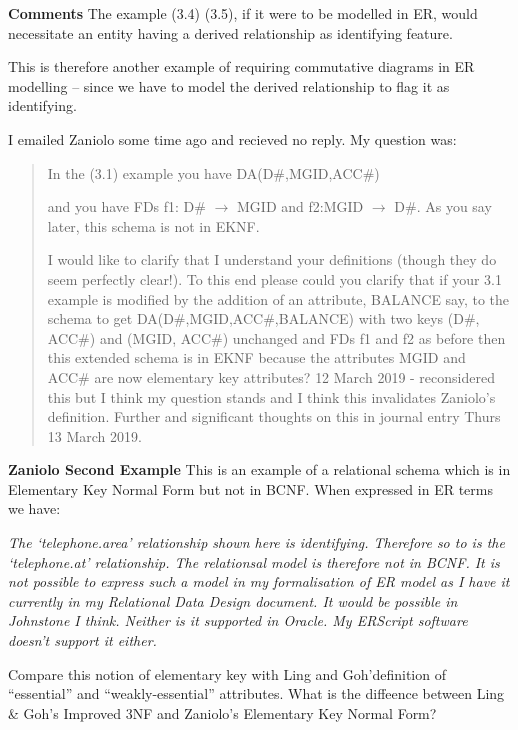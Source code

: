 \documentclass[10pt,a4paper]{scrartcl}
\renewcommand{\erpictureFolder}[0]{../SharedPictures}
\begin{document}
\textbf{Comments}
The example (3.4) (3.5), if it were to be modelled in ER, would necessitate an entity having a derived relationship as identifying feature.

This is therefore another example of requiring commutative diagrams in ER modelling -- since we have to model the derived relationship
to flag it as identifying.

I emailed Zaniolo some time ago and recieved no reply. My question was:
\begin{quote}
In the (3.1) example you have DA(D\#,MGID,ACC\#)  

and you have FDs f1: D\# $\rightarrow$ MGID and f2:MGID $\rightarrow$ D\#. As you say later, this schema is not in EKNF. 

I would like to clarify that I understand your definitions (though they do seem perfectly clear!). 
To this end please could you clarify that if your 3.1 example is modified by the addition of an attribute,
BALANCE say, to the schema to get DA(D\#,MGID,ACC\#,BALANCE) 
with two keys (D\#, ACC\#) and  (MGID, ACC\#) unchanged and FDs f1 and f2 
as before then this extended schema is in EKNF because 
the attributes MGID and ACC\# are now elementary key attributes? 
{\color{red} 12 March 2019 - reconsidered this but I think my question stands and I think this invalidates Zaniolo's definition. Further and significant thoughts on this in journal entry Thurs 13 March 2019. }
\end{quote}

\begin{center}

\end{center}


\textbf{Zaniolo Second Example}
This is an example of a relational schema which is in Elementary Key Normal Form but not in BCNF. When expressed in ER terms we have:
\begin{center}

\end{center}
\textit{The `telephone.area' relationship shown here is identifying. Therefore so to is the `telephone.at' relationship.
The relationsal model is therefore not in BCNF. It is not possible to express such a  model in my formalisation of ER model as I  have it currently in my Relational Data Design document. It would be possible in Johnstone I think. Neither is it supported in Oracle. My ERScript software doesn't support it either.} 


Compare this notion of elementary key with Ling and Goh'definition of ``essential'' and ``weakly-essential'' attributes. What is the diffeence between Ling \& Goh's Improved 3NF and Zaniolo's Elementary Key Normal Form?
\end{document}
